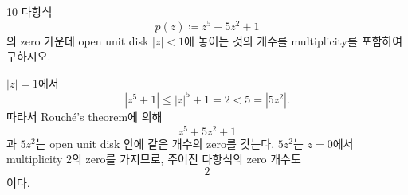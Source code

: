 \begin{problem}{10}
다항식
\[
    p(z)\coloneqq z^5+5z^2+1
\]
의 zero 가운데 open unit disk $|z|<1$에 놓이는 것의 개수를 multiplicity를 포함하여 구하시오.
\end{problem}

\begin{solution}
$|z|=1$에서
\[
    |z^5+1|
    \leq
    |z|^5+1
    =2
    <5
    =|5z^2|.
\]
따라서 Rouch\'e's theorem에 의해
\[
    z^5+5z^2+1
\]
과 $5z^2$는 open unit disk 안에 같은 개수의 zero를 갖는다. $5z^2$는 $z=0$에서 multiplicity $2$의 zero를 가지므로, 주어진 다항식의 zero 개수도
\[
    \boxed{2}
\]
이다.
\end{solution}
